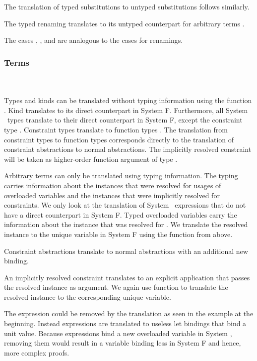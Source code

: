 \noindent The translation of typed substitutions to untyped substitutions follows similarly.
\DPTSub 

\noindent The typed renaming  translates to its untyped counterpart for arbitrary terms .

\noindent The cases , ,  and  are analogous to the cases for renamings. 

\subsubsection{Terms}\hfill\\\\
Types and kinds can be translated without typing information using the function . 
Kind  translates to its direct counterpart in System F. 
Furthermore, all System \Fo\ types translate to their direct counterpart in System F, except the constraint type \Constr{[}  \Constr{:}  \Constr{]⇒} .
\DPTType
Constraint types \Constr{[}  \Constr{:}  \Constr{]⇒}  translate to function types   . 
The translation from constraint types to function types corresponds directly to the translation of constraint abstractions to normal abstractions. 
The implicitly resolved constraint will be taken as higher-order function argument of type .

\noindent Arbitrary terms can only be translated using typing information.
The typing carries information about the instances that were resolved for usages of overloaded variables and the instances that were implicitly resolved for constraints. 
We only look at the translation of System \Fo\ expressions that do not have a direct counterpart in System F.
\DPTTerms
Typed overloaded variables  carry the information  about the instance that was resolved for .
We translate the resolved instance to the unique variable in System F using the  function from above.

\noindent Constraint abstractions translate to normal abstractions with an additional new binding. 

\noindent An implicitly resolved constraint translates to an explicit application that passes the resolved instance as argument. We again use function  to translate the resolved instance to the corresponding unique variable. 

\noindent The  expression could be removed by the translation as seen in the example at the beginning. 
Instead  expressions are translated to useless let bindings that bind a unit value.
Because  expressions bind a new overloaded variable in System \Fo, removing them would result in a variable binding less in System F and hence, more complex proofs. 

